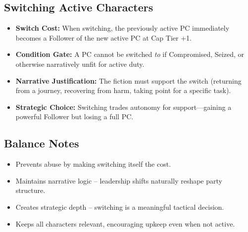 \subsection{Switching Active Characters}\label{subsec:switching_active}

\begin{itemize}
    \item \textbf{Switch Cost:} When switching, the previously active PC immediately becomes a Follower of the new active PC at Cap Tier +1.
    \item \textbf{Condition Gate:} A PC cannot be switched \emph{to} if Compromised, Seized, or otherwise narratively unfit for active duty.
    \item \textbf{Narrative Justification:} The fiction must support the switch (returning from a journey, recovering from harm, taking point for a specific task).
    \item \textbf{Strategic Choice:} Switching trades autonomy for support---gaining a powerful Follower but losing a full PC.
\end{itemize}

\subsection{Balance Notes}
\begin{itemize}
    \item Prevents abuse by making switching itself the cost.
    \item Maintains narrative logic -- leadership shifts naturally reshape party structure.
    \item Creates strategic depth -- switching is a meaningful tactical decision.
    \item Keeps all characters relevant, encouraging upkeep even when not active.
\end{itemize}

